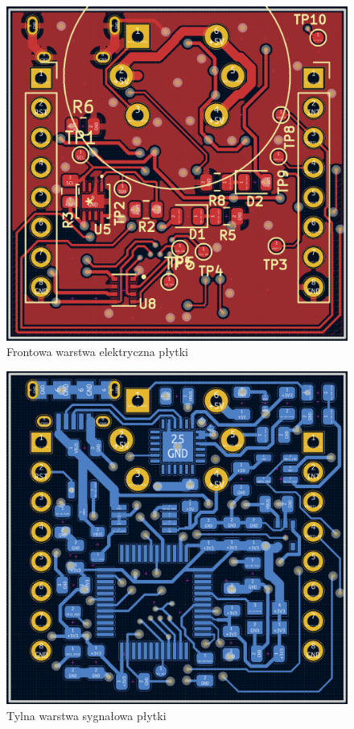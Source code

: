 \begin{figure}[H]
    \centering
    \includegraphics[width=\textwidth, height=\textheight, keepaspectratio]{Graphics/pcb_front.png}
    \caption{Frontowa warstwa elektryczna płytki}
    \label{img:front_layout}
\end{figure}

\begin{figure}[H]
    \centering
    \includegraphics[width=\textwidth, height=\textheight, keepaspectratio]{Graphics/pcb_back.png}
    \caption{Tylna warstwa sygnałowa płytki}
    \label{img:back_layout}
\end{figure}

